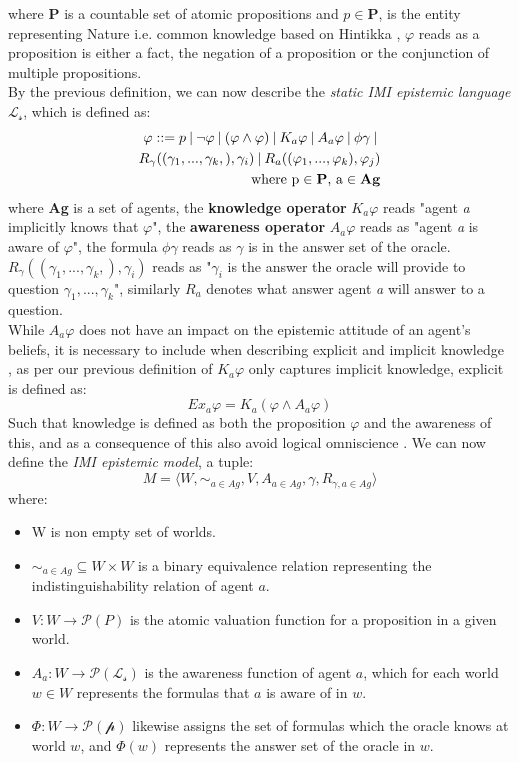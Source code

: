 where \textbf{P} is a countable set of atomic propositions and $p \in
	\mathbf{P}$, \oracle is the entity representing Nature i.e. common knowledge based on Hintikka \cite{hintikka88}, $\varphi$ reads as a proposition is either a fact, the negation of a
proposition or the conjunction of multiple propositions.\\ By the previous
definition, we can now describe the \textit{static IMI epistemic language}
$\mathscr{L_s}$, which is defined as:
\begin{align*}
	\varphi ::= p \:|\:\neg\varphi\:|\:(\varphi \land \varphi) \:|\: K_a\varphi \:|\: A_a\varphi \:|\: \phi\gamma \:|\:\\ R_\gamma((\gamma_1,...,\gamma_k,), \gamma_i) \:|\: R_a((\varphi_1,...,\varphi_k), \varphi_j) \\ \text{where p} \in \text{\textbf{P}}\text{, a} \in \text{\textbf{Ag}}
\end{align*}
where \textbf{Ag} is a set of agents, the \textbf{knowledge operator} $K_a\varphi$ reads "agent \textit{a} implicitly knows that $\varphi$", the \textbf{awareness operator} $A_a\varphi$ reads as "agent \textit{a} is aware of $\varphi$", the formula $\phi\gamma$ reads as $\gamma$ is in the answer set of the oracle. $R_\gamma((\gamma_1,...,\gamma_k,), \gamma_i)$ reads as "$\gamma_i$ is the answer the oracle will provide to question $\gamma_1,...,\gamma_k$", similarly $R_a$ denotes what answer agent \textit{a} will answer to a question. \\
While $A_a\varphi$ does not have an impact on the epistemic attitude of an agent's beliefs, it is necessary to include when describing explicit and implicit knowledge \cite{delimi}, as per our previous definition of $K_a\varphi$ only captures implicit knowledge, explicit is defined as:
$$
	Ex_a\varphi = K_a(\varphi \land A_a\varphi)
$$
Such that knowledge is defined as both the proposition $\varphi$ and the awareness of this, and as a consequence of this also avoid logical omniscience \cite{fagin87}\cite{vanbenthem2010}. We can now define the \textit{IMI epistemic model}, a tuple:
$$
	M = \langle W, \sim_{a\in Ag}, V, A_{a\in Ag}, \gamma, R_{\gamma,a\in Ag}\rangle
$$
where: 
\begin{itemize}
	\setlength\itemsep{-0.4em}
	\item W is non empty set of worlds.
	\item $\sim_{a\in Ag} \subseteq W \times W$ is a binary equivalence relation representing the indistinguishability relation of agent $a$. 
	\item $V : W \rightarrow \mathscr{P}(P)$ is the atomic valuation function for a proposition in a given world.
	\item $A_a : W \rightarrow \mathscr{P}(\mathscr{L_s})$ is the awareness function of agent $a$, which for each world $w \in W$ represents the formulas that $a$ is aware of in $w$.
	\item $\Phi : W \rightarrow \mathscr{P}(\mathscr{p}) $ likewise assigns the set of formulas which the oracle knows at world $w$, and $\Phi(w)$ represents the answer set of the oracle in $w$.
\end{itemize}
